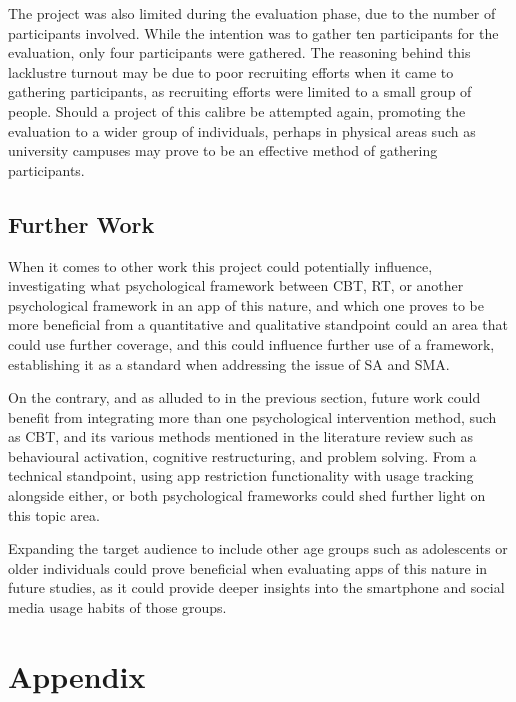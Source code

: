 \documentclass[12pt]{article}
\begin{document}
The project was also limited during the evaluation phase, due to the number of participants involved. While the intention was to gather ten participants for the evaluation, only 
four participants were gathered. The reasoning behind this lacklustre turnout may be due to poor recruiting efforts when it came to gathering participants, as recruiting 
efforts were limited to a small group of people. Should a project of this calibre be attempted again, promoting the evaluation to a wider group of individuals, perhaps in 
physical areas such as university campuses may prove to be an effective method of gathering participants.

\subsection{Further Work}
When it comes to other work this project could potentially influence, investigating what psychological framework between CBT, RT, or another psychological framework 
in an app of this nature, and which one proves to be more beneficial from a quantitative and qualitative standpoint could an area that could use further coverage, and this 
could influence further use of a framework, establishing it as a standard when addressing the issue of SA and SMA. \newline

On the contrary, and as alluded to in the previous section, future work could benefit from integrating more than one psychological intervention method, such as CBT, and 
its various methods mentioned in the literature review such as behavioural activation, cognitive restructuring, and problem solving. From a technical standpoint, using
app restriction functionality with usage tracking alongside either, or both psychological frameworks could shed further light on this topic area.\newline

Expanding the target audience to include other age groups such as adolescents or older individuals could prove beneficial when evaluating apps of this nature in future 
studies, as it could provide deeper insights into the smartphone and social media usage habits of those groups.




\newpage
{}
\printbibliography

\newpage
\section{Appendix}
\end{document}
